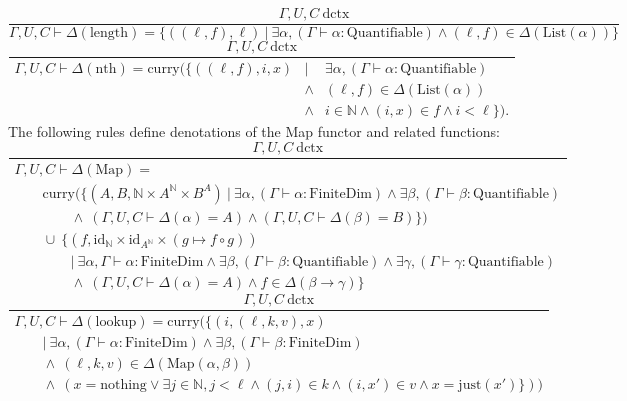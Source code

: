\documentclass[11pt]{article}
\begin{document}
\begin{equation}
	\frac{\Gamma,U,C\ \text{dctx}}
	{\Gamma,U,C \vdash \Delta(\text{length})
	= \{((\ell,f),\ell)\ |\ \exists \alpha,
	(\Gamma \vdash \alpha : \text{Quantifiable})
	\wedge (\ell,f) \in \Delta(\text{List}(\alpha))\}}
\end{equation}
\begin{equation}
	\frac{\Gamma,U,C\ \text{dctx}}
	{
		\begin{array}{rcl}
			\Gamma,U,C \vdash \Delta(\text{nth})
			= \text{curry}(\{((\ell,f),i,x)
			&|& \exists \alpha,
			(\Gamma \vdash \alpha : \text{Quantifiable})
			\\ &\wedge
			& (\ell,f) \in \Delta(\text{List}(\alpha))
			\\ &\wedge
			& i \in \mathbb{N} \wedge (i,x) \in f \wedge i < \ell\}).
		\end{array}
	}
\end{equation}
The following rules define denotations of the Map functor
and related functions:
\begin{equation}
	\frac{\Gamma,U,C\ \text{dctx}}
	{\begin{array}{l}
		\Gamma,U,C \vdash \Delta(\text{Map}) =
		\\ \qquad \text{curry}(\{(A, B, \mathbb{N} \times A^{\mathbb{N}} \times B^A)
		\ |\ \exists \alpha, (\Gamma \vdash \alpha : \text{FiniteDim})
		 \wedge \exists \beta, (\Gamma \vdash \beta : \text{Quantifiable})
		\\ \qquad\qquad \wedge\ (\Gamma,U,C \vdash \Delta(\alpha) = A)
		\wedge (\Gamma,U,C \vdash \Delta(\beta) = B)\})
		\\ \qquad \cup\ \{(f, \text{id}_{\mathbb{N}}
				\times \text{id}_{A^\mathbb{N}}
				\times (g \mapsto f \circ g))
		\\ \qquad\qquad |\ \exists \alpha, \Gamma \vdash \alpha : \text{FiniteDim}
		\wedge \exists \beta, (\Gamma \vdash \beta : \text{Quantifiable})
		\wedge \exists \gamma, (\Gamma \vdash \gamma : \text{Quantifiable})
		\\ \qquad\qquad \wedge\ (\Gamma,U,C \vdash \Delta(\alpha) = A)
		\wedge f \in \Delta(\beta \to \gamma)\}
	\end{array}}
\end{equation}
\begin{equation}
	\frac{\Gamma,U,C\ \text{dctx}}
	{\begin{array}{l}
		\Gamma,U,C \vdash \Delta(\text{lookup}) =
		\text{curry}(\{(i,(\ell,k,v),x)
		\\ \qquad |\ \exists \alpha, (\Gamma \vdash \alpha : \text{FiniteDim})
		\wedge \exists \beta, (\Gamma \vdash \beta : \text{FiniteDim})
		\\ \qquad \wedge\ (\ell,k,v) \in \Delta(\text{Map}(\alpha, \beta))
		\\ \qquad \wedge\ (x = \text{nothing} \vee \exists j \in \mathbb{N}, j < \ell \wedge
		(j,i) \in k \wedge (i,x') \in v \wedge x = \text{just}(x')\}))
	\end{array}}
\end{equation}
\end{document}
